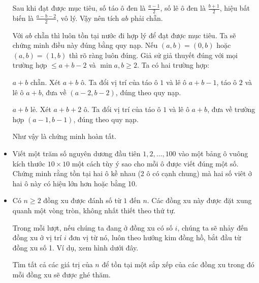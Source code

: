 \documentclass[11pt]{scrartcl}
\begin{document}
\begin{itemize}[label=, leftmargin=0em, itemsep=0.5em]
\begin{sol}
        Sau khi đạt được mục tiêu, số táo ô đen là $\frac{a - 1}{2}$, số lê ô đen là $\frac{b  + 1}{2}$, hiệu bất biến là $\frac{a - b - 2}{2}$, vô lý. Vậy nên tích $ab$ phải chẵn.

         Với $ab$ chẵn thì luôn tồn tại nước đi hợp lý để đạt được mục tiêu. Ta sẽ chứng minh điều này đúng bằng quy nạp. Nếu $(a, b) = (0,b)$ hoặc $(a,b) = (1,b)$ thì rõ ràng luôn đúng. Giả sử giả thuyết đúng với mọi trường hợp $ \leq a + b - 2$ và $\min{a,b} \geq 2$. Ta có hai trường hợp:
        
        $a + b$ chẵn. Xét $a + b$ ô. Ta đổi vị trí của táo ô $1$ và lê ô $a + b - 1$, táo ô $2$ và lê ô $a + b$, đưa về $(a - 2, b - 2)$, đúng theo quy nạp.
        
        $a + b$ lẻ. Xét $a + b + 2$ ô. Ta đổi vị trí của táo ô $1$ và lê ô $a + b$, đưa về trường hợp $(a - 1, b - 1)$, đúng theo quy nạp.

        Như vậy là chứng minh hoàn tất.
    \end{sol}

    
    \item \begin{bt}
        Viết một trăm số nguyên dương đầu tiên $1,2,\dots,100$ vào một bảng ô vuông kích thước $10\times 10$ một cách tùy ý sao cho mỗi ô được viết đúng một số. Chứng minh rằng tồn tại hai ô kề nhau (2 ô có cạnh chung) mà hai số viêt ở hai ô này có hiệu lớn hơn hoặc bằng 10.
    \end{bt}
    \begin{sol}
        
    \end{sol}
    \item \begin{btvn}
    Có $n \geq 2$ đồng xu được đánh số từ $1$ đến $n$. Các đồng xu này được đặt xung quanh một vòng tròn, không nhất thiết theo thứ tự.
    
    Trong mỗi lượt, nếu chúng ta đang ở đồng xu có số $i$, chúng ta sẽ nhảy đến đồng xu ở vị trí $i$ đơn vị từ nó, luôn theo hướng kim đồng hồ, bắt đầu từ đồng xu số 1. Ví dụ, xem hình dưới đây.
    
    Tìm tất cả các giá trị của $n$ để tồn tại một sắp xếp của các đồng xu trong đó mỗi đồng xu sẽ được ghé thăm.
    \end{btvn}


\end{itemize}
\end{document}
